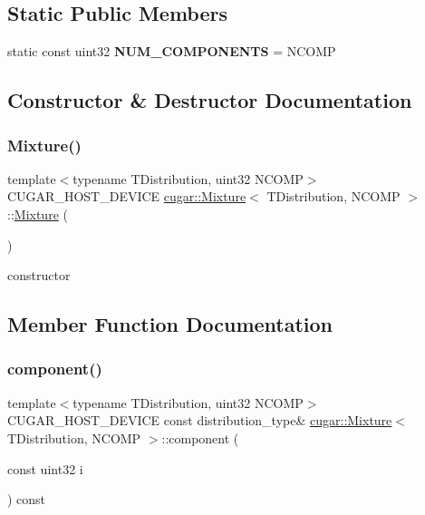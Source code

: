 \subsection*{Static Public Members}
\begin{DoxyCompactItemize}
\item 
\mbox{\label{structcugar_1_1_mixture_a4189bd7ab52e85fbcf8a51ccc19bf0ac}} 
static const uint32 {\bfseries N\+U\+M\+\_\+\+C\+O\+M\+P\+O\+N\+E\+N\+TS} = N\+C\+O\+MP
\end{DoxyCompactItemize}


\subsection{Constructor \& Destructor Documentation}
\mbox{\label{structcugar_1_1_mixture_a5749d6a34b2efbe87df854c09a3cee09}} 
\subsubsection{\texorpdfstring{Mixture()}{Mixture()}}
{\footnotesize\ttfamily template$<$typename T\+Distribution, uint32 N\+C\+O\+MP$>$ \\
C\+U\+G\+A\+R\+\_\+\+H\+O\+S\+T\+\_\+\+D\+E\+V\+I\+CE \hyperlink{structcugar_1_1_mixture}{cugar\+::\+Mixture}$<$ T\+Distribution, N\+C\+O\+MP $>$\+::\hyperlink{structcugar_1_1_mixture}{Mixture} (\begin{DoxyParamCaption}{ }\end{DoxyParamCaption})\hspace{0.3cm}{\ttfamily [inline]}}

constructor 

\subsection{Member Function Documentation}
\mbox{\label{structcugar_1_1_mixture_a9a558f72b8f9e9735942014f2a07c37b}} 
\subsubsection{\texorpdfstring{component()}{component()}\hspace{0.1cm}{\footnotesize\ttfamily [1/2]}}
{\footnotesize\ttfamily template$<$typename T\+Distribution, uint32 N\+C\+O\+MP$>$ \\
C\+U\+G\+A\+R\+\_\+\+H\+O\+S\+T\+\_\+\+D\+E\+V\+I\+CE const distribution\+\_\+type\& \hyperlink{structcugar_1_1_mixture}{cugar\+::\+Mixture}$<$ T\+Distribution, N\+C\+O\+MP $>$\+::component (\begin{DoxyParamCaption}\item[{const uint32}]{i }\end{DoxyParamCaption}) const\hspace{0.3cm}{\ttfamily [inline]}}

